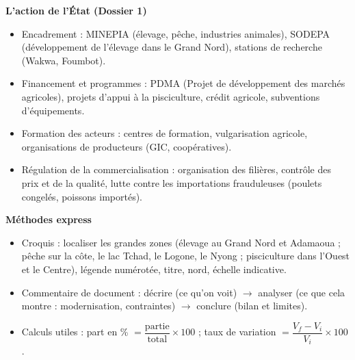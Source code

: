 \documentclass[11pt]{article}
\newcommand{\cle}[1]{{\popxbold\color{popdark}#1}}
\begin{document}
\begin{bilan}
\textbf{L'action de l'État (Dossier 1)}
\begin{itemize}
  \item Encadrement : MINEPIA (élevage, pêche, industries animales), SODEPA (développement de l'élevage dans le Grand Nord), stations de recherche (Wakwa, Foumbot).
  \item Financement et programmes : \cle{PDMA} (Projet de développement des marchés agricoles), projets d'appui à la pisciculture, crédit agricole, subventions d'équipements.
  \item Formation des acteurs : centres de formation, vulgarisation agricole, organisations de producteurs (GIC, coopératives).
  \item Régulation de la commercialisation : organisation des filières, contrôle des prix et de la qualité, lutte contre les importations frauduleuses (poulets congelés, poissons importés).
\end{itemize}

\textbf{Méthodes express}
\begin{itemize}
  \item Croquis : localiser les grandes zones (élevage au Grand Nord et Adamaoua ; pêche sur la côte, le lac Tchad, le Logone, le Nyong ; pisciculture dans l'Ouest et le Centre), légende numérotée, titre, nord, échelle indicative.
  \item Commentaire de document : décrire (ce qu'on voit) $\rightarrow$ analyser (ce que cela montre : modernisation, contraintes) $\rightarrow$ conclure (bilan et limites).
  \item Calculs utiles : part en \% $= \dfrac{\text{partie}}{\text{total}} \times 100$ ; taux de variation $= \dfrac{V_f - V_i}{V_i} \times 100$.
\end{itemize}
\end{bilan}
\end{document}
